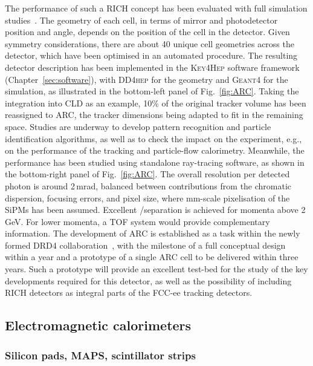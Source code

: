 The performance of such a RICH concept has been evaluated with full simulation studies~\cite{Delgado_ARC}. 
The geometry of each cell, in terms of mirror and photodetector position and angle, 
depends on the position of the cell in the detector.  
Given symmetry considerations, there are about 40 unique cell geometries across the detector, 
which have been optimised in an automated procedure. 
The resulting detector description has been implemented in the \textsc{Key4Hep} software framework (Chapter~\ref{sec:software}), 
with \textsc{DD4hep} for the geometry and \textsc{Geant4} for the simulation, 
as illustrated in the bottom-left panel of Fig.~\ref{fig:ARC}. 
Taking the integration into CLD as an example, 
10\% of the original tracker volume has been reassigned to ARC, 
the tracker dimensions being adapted to fit in the remaining space. 
Studies are underway to develop pattern recognition and particle identification algorithms, 
as well as to check the impact on the experiment, e.g., on the performance of the tracking and particle-flow calorimetry. 
Meanwhile, the performance has been studied using standalone ray-tracing software, 
as shown in the bottom-right panel of Fig.~\ref{fig:ARC}.
The overall resolution per detected photon is around 2\,mrad, 
balanced between contributions from the chromatic dispersion, focusing errors, and pixel size, 
where mm-scale pixelisation of the SiPMs has been assumed. 
Excellent \PK/\PGp separation is achieved for momenta above 2\,GeV. 
For lower momenta, a TOF system would provide complementary information. 
The development of ARC is established as a task within the newly formed DRD4 collaboration~\cite{Easo_DRD4}, 
with the milestone of a full conceptual design within a year 
and a prototype of a single ARC cell to be delivered within three years. 
Such a prototype will provide an excellent test-bed for the study of the key developments required for this detector,
as well as the possibility of including RICH detectors as integral parts of the FCC-ee tracking detectors.

\subsection{Electromagnetic calorimeters}
\label{sec:ECALs}

\subsubsection{Silicon pads, MAPS, scintillator strips}

